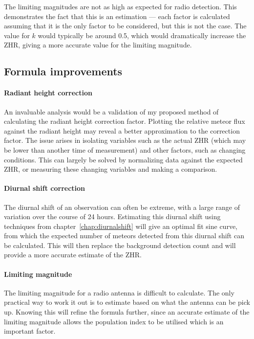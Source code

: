 The limiting magnitudes are not as high as expected for radio detection. This
demonstrates the fact that this is an estimation --- each factor is calculated
assuming that it is the only factor to be considered, but this is not the case.
The value for $k$ would typically be around 0.5, which would dramatically
increase the ZHR, giving a more accurate value for the limiting magnitude.

\subsection{Formula improvements}

\paragraph{Radiant height correction\\}

An invaluable analysis would be a validation of my proposed method of
calculating the radiant height correction factor. Plotting the relative meteor
flux against the radiant height may reveal a better approximation to the
correction factor. The issue arises in isolating variables such as the actual
ZHR (which may be lower than another time of measurement) and other factors,
such as changing conditions. This can largely be solved by normalizing data
against the expected ZHR, or measuring these changing variables and making a
comparison.

\paragraph{Diurnal shift correction\\}

The diurnal shift of an observation can often be extreme, with a large range of
variation over the course of 24 hours. Estimating this diurnal shift using
techniques from chapter~\ref{chap:diurnalshift} will give an optimal fit sine
curve, from which the expected number of meteors detected from this diurnal
shift can be calculated. This will then replace the background detection count
and will provide a more accurate estimate of the ZHR.

\paragraph{Limiting magnitude\\}

The limiting magnitude for a radio antenna is difficult to calculate. The only
practical way to work it out is to estimate based on what the antenna can be
pick up. Knowing this will refine the formula further, since an accurate
estimate of the limiting magnitude allows the population index to be utilised
which is an important factor.

